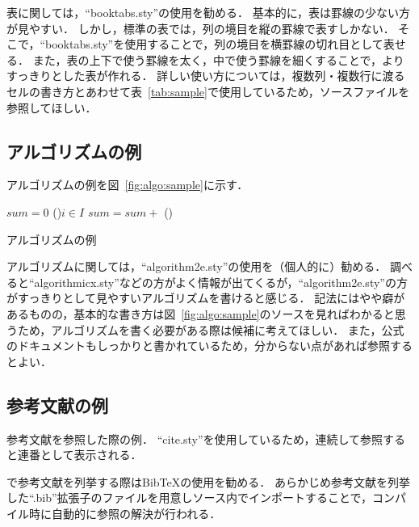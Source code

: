 \documentclass[lualatex]{ipsj}
\newcommand{\Fig}[1]{図~#1}
\newcommand{\Tab}[1]{表~#1}
\begin{document}
  表に関しては，``booktabs.sty''の使用を勧める．
  基本的に，表は罫線の少ない方が見やすい．
  しかし，{\LaTeXe}標準の表では，列の境目を縦の罫線で表すしかない．
  そこで，``booktabs.sty''を使用することで，列の境目を横罫線の切れ目として表せる．
  また，表の上下で使う罫線を太く，中で使う罫線を細くすることで，よりすっきりとした表が作れる．
  詳しい使い方については，複数列・複数行に渡るセルの書き方とあわせて\Tab{\ref{tab:sample}}で使用しているため，ソースファイルを参照してほしい．
  
  \subsection{アルゴリズムの例}
  アルゴリズムの例を\Fig{\ref{fig:algo:sample}}に示す．
  
    \begin{algorithm}[t]
    \small
    \DontPrintSemicolon
    $sum = 0$\;
    \ForEach(){$i \in I$}{
      $sum = sum +$ 
    }
   	\BlankLine
   	\Proc(){}{
    }
    \caption{アルゴリズムの例}
    \label{fig:algo:sample}
    \end{algorithm}
  
  アルゴリズムに関しては，``algorithm2e.sty''の使用を（個人的に）勧める．
  調べると``algorithmicx.sty''などの方がよく情報が出てくるが，``algorithm2e.sty''の方がすっきりとして見やすいアルゴリズムを書けると感じる．
  記法にはやや癖があるものの，基本的な書き方は\Fig{\ref{fig:algo:sample}}のソースを見ればわかると思うため，アルゴリズムを書く必要がある際は候補に考えてほしい．
  また，公式のドキュメントもしっかりと書かれているため，分からない点があれば参照するとよい．
  
  \subsection{参考文献の例}
  参考文献を参照した際の例\cite{book:Aho2006,icde:Diao2002,new-gen-comp:Kowalski1989,tech:Hopcroft1971,url:grep}．
  ``cite.sty''を使用しているため，連続して参照すると連番として表示される．
  
  {\LaTeXe}で参考文献を列挙する際はBibTeXの使用を勧める．
  あらかじめ参考文献を列挙した``.bib''拡張子のファイルを用意し{\LaTeXe}ソース内でインポートすることで，コンパイル時に自動的に参照の解決が行われる．
  
\end{document}
